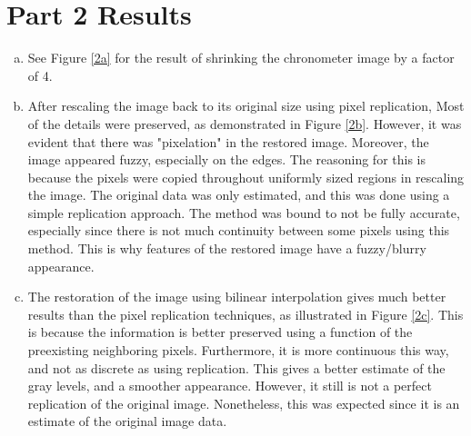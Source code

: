 \documentclass[../report1_rarnold.tex]{subfiles}
\begin{document}
\section*{Part 2 Results}

\begin{enumerate}[a.]
	\item See Figure \ref{2a} for the result of shrinking the chronometer image by a factor of 4.
	 
	\item  
\noindent After rescaling the image back to its original size using pixel replication, Most of the details were preserved, as demonstrated in Figure \ref{2b}.  However, it was evident that there was "pixelation" in the restored image.  Moreover, the image appeared fuzzy, especially on the edges.  The reasoning for this is because the pixels were copied throughout uniformly sized regions in rescaling the image.  The original data was only estimated, and this was done using a simple replication approach. The method was bound to not be fully accurate, especially since there is not much continuity between some pixels using this method.  This is why features of the restored image have a fuzzy/blurry appearance.


	\item 	  
The restoration of the image using bilinear interpolation gives much better results than the pixel replication techniques, as illustrated in Figure \ref{2c}.  This is because the information is better preserved using a function of the preexisting neighboring pixels.  Furthermore, it is more continuous this way, and not as discrete as using replication.  This gives a better estimate of the gray levels, and a smoother appearance.  However, it still is not a perfect replication of the original image.  Nonetheless, this was expected since it is an estimate of the original image data.

\end{enumerate}
\end{document}
